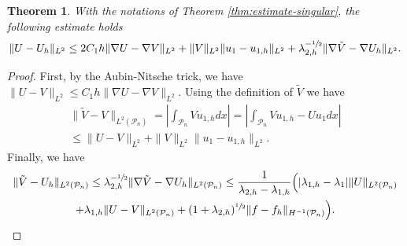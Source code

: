 \documentclass[11pt]{article}
\numberwithin{equation}{section}\newtheorem*{jepEnonce}{\jepEnonceTitle}\newenvironment{enonce*}[1]{\def\jepEnonceTitle{#1}\jepEnonce}{\endjepEnonce}\newtheorem*{conj*}{Conjecture}
\theoremstyle{plain}
\newtheorem{thm}{Theorem}[section]
\theoremstyle{definition}
\newcommand{\lb}{\lambda}
\let\jepOriginalSfrac\sfrac
\renewcommand{\sfrac}[2]{{\jepOriginalSfrac{#1}{#2}}}
\begin{document}
\begin{thm}\label{thm:estimate-singular-L2}
With the notations of Theorem \ref{thm:estimate-singular}, the following estimate holds
\[
\|U-U_{h}\|_{L^2}\le 2C_1h \|\nabla U-\nabla V\|_{L^2} + \|V\|_{L^2}\|u_1-u_{1,h}\|_{L^2}+ \lb_{2,h}^{-\sfrac 12} \| \nabla \tilde V-\nabla U_h\|_{L^2}.
\]
\end{thm}
\begin{proof}
First, by the Aubin-Nitsche trick, we have $\|U-V\|_{L^2}\le C_1h \|\nabla U-\nabla V\|_{L^2}$.
Using the definition of $\tilde V$ we have
\vspace*{-5pt}
\begin{multline*}
\|\tilde V-V\|_{L^2(\mathcal P_n)} = \left|\int_{\mathcal P_n} Vu_{1,h} dx\right| = \left|\int_{\mathcal P_n} Vu_{1,h}-U u_1 dx\right|\\
\le \|U-V\|_{L^2}+ \|V\|_{L^2}\|u_1-u_{1,h}\|_{L^2}.
\end{multline*}
Finally, we have
\vspace*{-5pt}
\begin{multline*} \|\tilde V-U_h\|_{L^2(\mathcal P_n)} \le \lb_{2,h}^{-\sfrac 12} \| \nabla \tilde V-\nabla U_h\|_{L^2(\mathcal P_n)}
\le \frac{1}{\lb_{2,h}-\lb_{1,h}} \Big (|\lb_{1,h}-\lb_1| \|U\|_{L^2(\mathcal P_n)}\\
+ \lb_{1,h}\|U-V\|_{L^2(\mathcal P_n)}+ (1+ \lb_{2,h})^{\sfrac 12}\|f-f_h\|_{H^{-1} (\mathcal P_n)}\Big).\qedhere
\end{multline*}
\end{proof}
\end{document}
